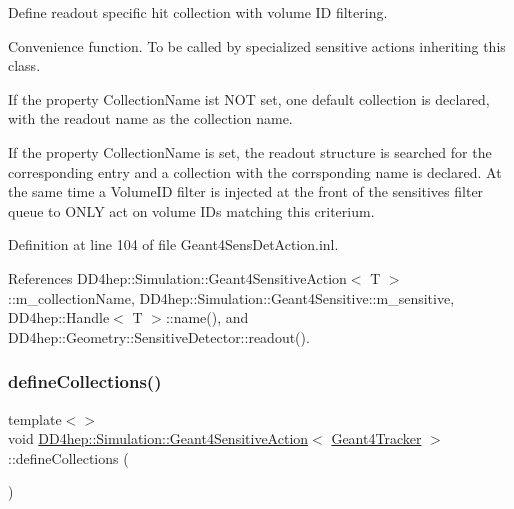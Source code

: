 Define readout specific hit collection with volume ID filtering. 

Convenience function. To be called by specialized sensitive actions inheriting this class.


\begin{DoxyItemize}
\item If the property Collection\+Name ist N\+OT set, one default collection is declared, with the readout name as the collection name.
\item If the property Collection\+Name is set, the readout structure is searched for the corresponding entry and a collection with the corrsponding name is declared. At the same time a Volume\+ID filter is injected at the front of the sensitive\textquotesingle{}s filter queue to O\+N\+LY act on volume I\+Ds matching this criterium. 
\end{DoxyItemize}

Definition at line 104 of file Geant4\+Sens\+Det\+Action.\+inl.



References D\+D4hep\+::\+Simulation\+::\+Geant4\+Sensitive\+Action$<$ T $>$\+::m\+\_\+collection\+Name, D\+D4hep\+::\+Simulation\+::\+Geant4\+Sensitive\+::m\+\_\+sensitive, D\+D4hep\+::\+Handle$<$ T $>$\+::name(), and D\+D4hep\+::\+Geometry\+::\+Sensitive\+Detector\+::readout().

\hypertarget{class_d_d4hep_1_1_simulation_1_1_geant4_sensitive_action_a72dbf8f8489f717a74cf84c36c27b595}{}\label{class_d_d4hep_1_1_simulation_1_1_geant4_sensitive_action_a72dbf8f8489f717a74cf84c36c27b595} 
\subsubsection{\texorpdfstring{define\+Collections()}{defineCollections()}\hspace{0.1cm}{\footnotesize\ttfamily [1/7]}}
{\footnotesize\ttfamily template$<$$>$ \\
void \hyperlink{class_d_d4hep_1_1_simulation_1_1_geant4_sensitive_action}{D\+D4hep\+::\+Simulation\+::\+Geant4\+Sensitive\+Action}$<$ \hyperlink{class_d_d4hep_1_1_simulation_1_1_geant4_tracker}{Geant4\+Tracker} $>$\+::define\+Collections (\begin{DoxyParamCaption}{ }\end{DoxyParamCaption})\hspace{0.3cm}{\ttfamily [virtual]}}



